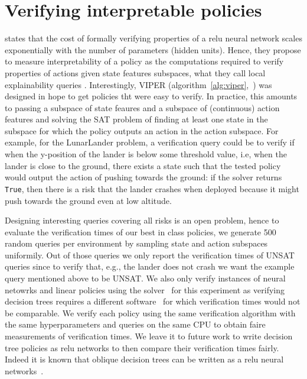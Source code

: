\section{Verifying interpretable policies}\label{sec:verif}
\cite{lens-complexity} states that the cost of formally verifying properties of a relu neural network scales exponentially with the number of parameters (hidden units).
Hence, they propose to measure interpretability of a policy as the computations required to verify properties of actions given state features subspaces, what they call local explainability queries \cite{query}.
Interestingly, VIPER (algorithm~\ref{alg:viper},~\cite{viper}) was designed in hope to get policies tht were easy to verify.
In practice, this amounts to passing a subspace of state feaures and a subspace of (continuous) action features and solving the SAT problem of finding at least one state in the subspace for which the policy outputs an action in the action subspace.
For example, for the LunarLander problem, a verification query could be to verify if when the y-position of the lander is below some threshold value, i.e, when the lander is close to the ground, there exists a state such that the tested policy would output the action of pushing towards the ground: if the solver returns \texttt{True}, then there is a risk that the lander crashes when deployed because it might push towards the ground even at low altitude.

Designing interesting queries covering all risks is an open problem, hence to evaluate the verification times of our best in class policies, we generate 500 random queries per environment by sampling state and action subspaces uniformily.
Out of those queries we only report the verification times of UNSAT queries since to verify that, e.g., the lander does not crash we want the example query mentioned above to be UNSAT.
We also only verify instances of neural netowrks and linear policies using the solver~\cite{maraboupy} for this experiment as verifying decision trees requires a different software~\cite{z3} for which verification times would not be comparable.
We verify each policy using the same verification algorithm with the same hyperparameters and queries on the same CPU to obtain faire measurements of verification times.
We leave it to future work to write decision tree policies as relu networks to then compare their verification times fairly.
Indeed it is known that oblique decision trees can be written as a relu neural networks~\cite{Lee2020Oblique}.

